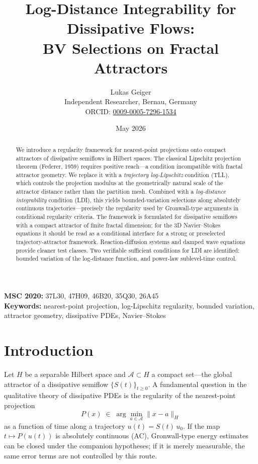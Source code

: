 \documentclass[12pt,a4paper]{article}
\title{\textbf{Log-Distance Integrability for Dissipative Flows:\\
BV Selections on Fractal Attractors}}
\author{Lukas Geiger\\
\small Independent Researcher, Bernau, Germany\\
\small ORCID: \href{https://orcid.org/0009-0005-7296-1534}{0009-0005-7296-1534}}
\date{May 2026}
\theoremstyle{definition}
\theoremstyle{plain}
\theoremstyle{remark}
\begin{document}
\maketitle

\begin{center}
\small
\textbf{MSC 2020:} 37L30, 47H09, 46B20, 35Q30, 26A45\\
\textbf{Keywords:} nearest-point projection, log-Lipschitz regularity,
bounded variation, attractor geometry, dissipative PDEs, Navier--Stokes
\end{center}

\begin{abstract}
We introduce a regularity framework for nearest-point projections
onto compact attractors of dissipative semiflows in Hilbert spaces.
The classical Lipschitz projection theorem (Federer, 1959) requires
positive reach---a condition incompatible with fractal attractor
geometry.  We replace it with a \emph{trajectory log-Lipschitz}
condition (TLL), which controls the projection modulus at the
geometrically natural scale of the attractor distance rather than
the partition mesh.  Combined with a \emph{log-distance
integrability} condition (LDI), this yields bounded-variation
selections along absolutely continuous trajectories---precisely the
regularity used by Gronwall-type arguments in conditional
regularity criteria.  The framework is formulated for dissipative
semiflows with a compact attractor of finite fractal dimension; for
the 3D Navier--Stokes equations it should be read as a conditional
interface for a strong or preselected trajectory-attractor framework.
Reaction-diffusion systems and damped wave equations provide cleaner
test classes.  Two verifiable sufficient
conditions for LDI are identified: bounded variation of the
log-distance function, and power-law sublevel-time control.
\end{abstract}

\clearpage
{}
\tableofcontents
\clearpage
{}

\section{Introduction}

Let $H$ be a separable Hilbert space and $\mathcal{A} \subset H$ a
compact set---the global attractor of a dissipative semiflow
$\{S(t)\}_{t \ge 0}$.  A fundamental question in the qualitative
theory of dissipative PDEs is the regularity of the nearest-point
projection
\[
  P(x) \;\in\; \arg\min_{a \in \mathcal{A}} \|x - a\|_H
\]
as a function of time along a trajectory $u(t) = S(t)\,u_0$.  If the
map $t \mapsto P(u(t))$ is absolutely continuous (AC), Gronwall-type
energy estimates can be closed under the companion hypotheses; if it
is merely measurable, the same error terms are not controlled by this
route.
\end{document}
